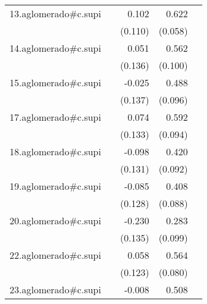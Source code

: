 {\begin{longtable}{l*{4}{D{.}{.}{-1}}}
\addlinespace
13.aglomerado#c.supi&                     &       0.102         &       0.622\sym{***}&                     \\
            &                     &     (0.110)         &     (0.058)         &                     \\
\addlinespace
14.aglomerado#c.supi&                     &       0.051         &       0.562\sym{***}&                     \\
            &                     &     (0.136)         &     (0.100)         &                     \\
\addlinespace
15.aglomerado#c.supi&                     &      -0.025         &       0.488\sym{***}&                     \\
            &                     &     (0.137)         &     (0.096)         &                     \\
\addlinespace
17.aglomerado#c.supi&                     &       0.074         &       0.592\sym{***}&                     \\
            &                     &     (0.133)         &     (0.094)         &                     \\
\addlinespace
18.aglomerado#c.supi&                     &      -0.098         &       0.420\sym{***}&                     \\
            &                     &     (0.131)         &     (0.092)         &                     \\
\addlinespace
19.aglomerado#c.supi&                     &      -0.085         &       0.408\sym{***}&                     \\
            &                     &     (0.128)         &     (0.088)         &                     \\
\addlinespace
20.aglomerado#c.supi&                     &      -0.230         &       0.283\sym{**} &                     \\
            &                     &     (0.135)         &     (0.099)         &                     \\
\addlinespace
22.aglomerado#c.supi&                     &       0.058         &       0.564\sym{***}&                     \\
            &                     &     (0.123)         &     (0.080)         &                     \\
\addlinespace
23.aglomerado#c.supi&                     &      -0.008         &       0.508\sym{***}&                     \\

\end{longtable}}
